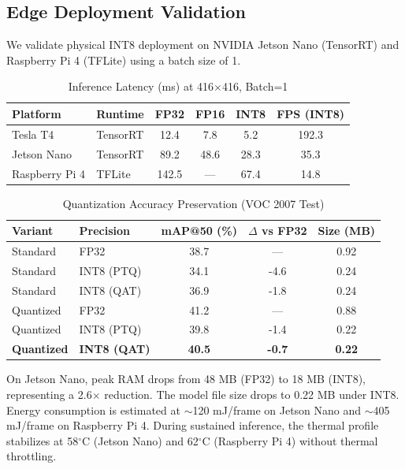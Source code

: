 \documentclass[article,submit,moreauthors,pdftex,10pt,a4paper]{article}
\begin{document}
\subsection{Edge Deployment Validation}
We validate physical INT8 deployment on NVIDIA Jetson Nano (TensorRT) and Raspberry Pi 4 (TFLite) using a batch size of 1.

\begin{table}[h]
\centering
\caption{Inference Latency (ms) at 416$\times$416, Batch=1}
\label{tab:latency}
\begin{tabular}{llcccc}
\toprule
Platform & Runtime & FP32 & FP16 & INT8 & FPS (INT8) \\
\midrule
Tesla T4 & TensorRT & 12.4 & 7.8 & 5.2 & 192.3 \\
Jetson Nano & TensorRT & 89.2 & 48.6 & 28.3 & 35.3 \\
Raspberry Pi 4 & TFLite & 142.5 & --- & 67.4 & 14.8 \\
\bottomrule
\end{tabular}
\end{table}

\begin{table}[h]
\centering
\caption{Quantization Accuracy Preservation (VOC 2007 Test)}
\label{tab:quantization_preservation}
\begin{tabular}{llccc}
\toprule
Variant & Precision & mAP@50 (\%) & $\Delta$ vs FP32 & Size (MB) \\
\midrule
Standard & FP32 & 38.7 & --- & 0.92 \\
Standard & INT8 (PTQ) & 34.1 & -4.6 & 0.24 \\
Standard & INT8 (QAT) & 36.9 & -1.8 & 0.24 \\
Quantized & FP32 & 41.2 & --- & 0.88 \\
Quantized & INT8 (PTQ) & 39.8 & -1.4 & 0.22 \\
\textbf{Quantized} & \textbf{INT8 (QAT)} & \textbf{40.5} & \textbf{-0.7} & \textbf{0.22} \\
\bottomrule
\end{tabular}
\end{table}

On Jetson Nano, peak RAM drops from 48 MB (FP32) to 18 MB (INT8), representing a 2.6$\times$ reduction. The model file size drops to 0.22 MB under INT8. Energy consumption is estimated at $\sim$120 mJ/frame on Jetson Nano and $\sim$405 mJ/frame on Raspberry Pi 4. During sustained inference, the thermal profile stabilizes at 58$^\circ$C (Jetson Nano) and 62$^\circ$C (Raspberry Pi 4) without thermal throttling.
\end{document}
